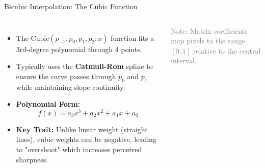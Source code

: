\documentclass[aspectratio=169,10pt]{beamer}
\begin{document}
\begin{frame}{Bicubic Interpolation: The Cubic Function}
\begin{columns}[T,onlytextwidth]
\small
\begin{itemize}
    \item The $\text{Cubic}(p_{-1}, p_0, p_1, p_2; x)$ function fits a 3rd-degree polynomial through 4 points.
    \item Typically uses the \textbf{Catmull-Rom} spline to ensure the curve passes through $p_0$ and $p_1$ while maintaining slope continuity.
    
    \item \textbf{Polynomial Form:}
    \[ f(x) = a_3x^3 + a_2x^2 + a_1x + a_0 \]
    
    \item \textbf{Key Trait:} Unlike linear weight (straight lines), cubic weights can be negative, leading to "overshoot" which increases perceived sharpness.
\end{itemize}

\centering
{}
\vfill
\scriptsize\textcolor{gray}{Note: Matrix coefficients map pixels to the range $[0, 1]$ relative to the central interval.}
\end{columns}
\end{frame}
\end{document}

